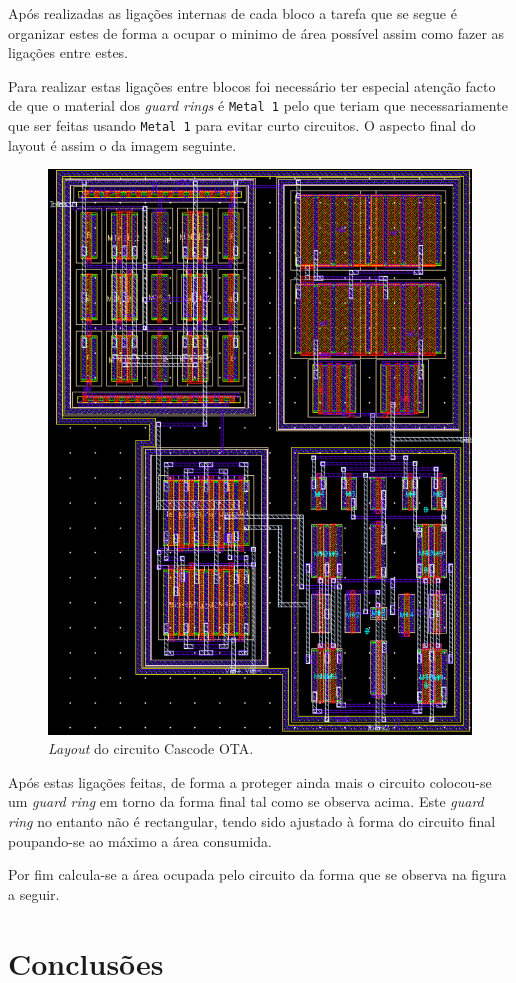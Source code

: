 \documentclass[11pt]{article}
\numberwithin{equation}{section}
\begin{document}
Após realizadas as ligações internas de cada bloco a tarefa que se segue é organizar estes de forma a ocupar o minimo de área possível assim como fazer as ligações entre estes.

Para realizar estas ligações entre blocos foi necessário ter especial atenção facto de que o material dos \textit{guard rings} é \texttt{Metal 1} pelo que teriam que necessariamente que ser feitas usando \texttt{Metal 1} para evitar curto circuitos. O aspecto final do layout é assim o da imagem seguinte.

\begin{figure}[H]
	\centering
	\includegraphics[keepaspectratio=true, scale=0.50]{exps/layout/full}
	\vspace{-0.5em}
	\caption{\textit{Layout} do circuito Cascode OTA.}
	\vspace{-0.8em} 
\end{figure}

Após estas ligações feitas, de forma a proteger ainda mais o circuito colocou-se um \textit{guard ring} em torno da forma final tal como se observa acima. Este \textit{guard ring} no entanto não é rectangular, tendo sido ajustado à forma do circuito final poupando-se ao máximo a área consumida.

Por fim calcula-se a área ocupada pelo circuito da forma que se observa na figura a seguir.

\pagebreak

\section{Conclusões}
\end{document}
